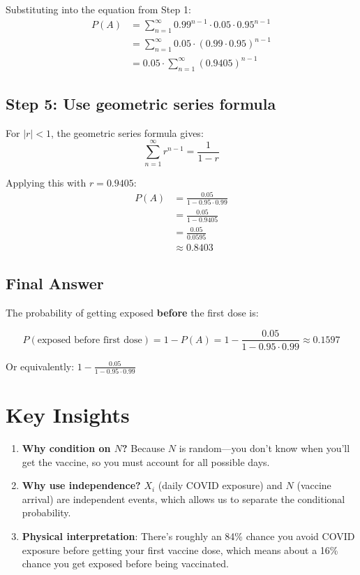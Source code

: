 \documentclass[11pt]{article}
\begin{document}
Substituting into the equation from Step 1:
\begin{align}
P(A) &= \sum_{n=1}^{\infty} 0.99^{n-1} \cdot 0.05 \cdot 0.95^{n-1}\\
&= \sum_{n=1}^{\infty} 0.05 \cdot (0.99 \cdot 0.95)^{n-1}\\
&= 0.05 \cdot \sum_{n=1}^{\infty} (0.9405)^{n-1}
\end{align}

\subsection{Step 5: Use geometric series formula}

For $|r| < 1$, the geometric series formula gives:
\begin{equation}
\sum_{n=1}^{\infty} r^{n-1} = \frac{1}{1-r}
\end{equation}

Applying this with $r = 0.9405$:
\begin{align}
P(A) &= \frac{0.05}{1 - 0.95 \cdot 0.99}\\
&= \frac{0.05}{1 - 0.9405}\\
&= \frac{0.05}{0.0595}\\
&\approx 0.8403
\end{align}

\subsection{Final Answer}

The probability of getting exposed \textbf{before} the first dose is:
\begin{tcolorbox}[colback=green!5!white,colframe=green!75!black,title=Final Answer]
\begin{equation}
P(\text{exposed before first dose}) = 1 - P(A) = 1 - \frac{0.05}{1 - 0.95 \cdot 0.99} \approx 0.1597
\end{equation}

Or equivalently: $\boxed{1 - \frac{0.05}{1 - 0.95 \cdot 0.99}}$
\end{tcolorbox}

\section{Key Insights}

\begin{enumerate}
    \item \textbf{Why condition on $N$?} Because $N$ is random---you don't know when you'll get the vaccine, so you must account for all possible days.

    \item \textbf{Why use independence?} $X_i$ (daily COVID exposure) and $N$ (vaccine arrival) are independent events, which allows us to separate the conditional probability.

    \item \textbf{Physical interpretation}: There's roughly an 84\% chance you avoid COVID exposure before getting your first vaccine dose, which means about a 16\% chance you get exposed before being vaccinated.
\end{enumerate}
\end{document}
